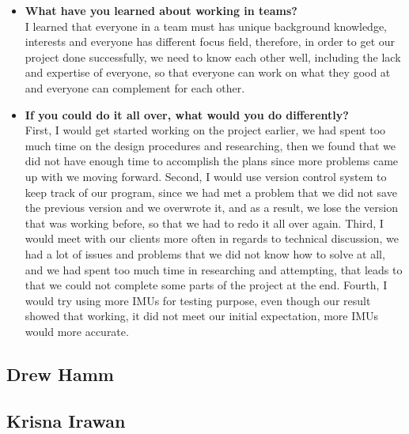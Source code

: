 \begin{itemize}
			\item \textbf{What have you learned about working in teams?}
			\\I learned that everyone in a team must has unique background knowledge, interests and everyone has different focus field, therefore, in order to get our project done successfully, we need to know each other well, including the lack and expertise of everyone, so that everyone can work on what they good at and everyone can complement for each other.\\

			\item \textbf{If you could do it all over, what would you do differently?}
			\\First, I would get started working on the project earlier, we had spent too much time on the design procedures and researching, then we found that we did not have enough time to accomplish the plans since more problems came up with we moving forward. Second, I would use version control system to keep track of our program, since we had met a problem that we did not save the previous version and we overwrote it, and as a result, we lose the version that was working before, so that we had to redo it all over again. Third, I would meet with our clients more often in regards to technical discussion, we had a lot of issues and problems that we did not know how to solve at all, and we had spent too much time in researching and attempting, that leads to that we could not complete some parts of the project at the end. Fourth, I would try using more IMUs for testing purpose, even though our result showed that working, it did not meet our initial expectation, more IMUs would more accurate.\\
		\end{itemize}

	
	\subsection{Drew Hamm}
	\subsection{Krisna Irawan}



